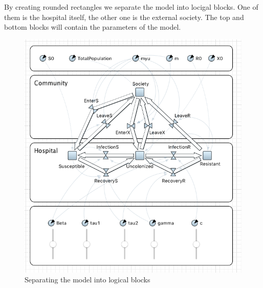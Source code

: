 By creating rounded rectangles we separate the model into locigal blocks. One of them is the hospital itself, the other one is the external society. The top and bottom blocks will contain the parameters of the model.

\begin{figure}[H]
  \centering
  \includegraphics[height=0.6\textwidth]{img/screens/boxes/boxes4}
  \caption{Separating the model into logical blocks}
\end{figure}